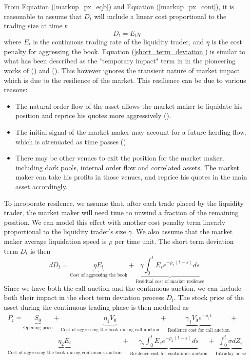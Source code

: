 \documentclass{article}
\begin{document}
From Equation (\ref{markup_px_eqb}) and Equation (\ref{markup_px_cont}), it is reasonable to assume that $D_t$ will include a linear cost proportional to the trading size at time $t$:
\begin{equation}\label{short_term_deviation}
  D_t = E_t \eta
\end{equation}
where $E_t$ is the continuous trading rate of the liquidity trader, and $\eta$ is the cost penalty for aggressing the book. Equation (\ref{short_term_deviation}) is similar to what has been described as the "temporary impact" term in in the pioneering works of (\cite{BertimasLo1999}) and (\cite{AlmgrenChriss2000}). This however ignores the transient nature of market impact which is due to the resilience of the market. This resilience can be due to various reasons:
\begin{itemize}
  \item The natural order flow of the asset allows the market maker to liquidate his position and reprice his quotes more aggressively (\cite{Avellaneda2008}).
  \item The initial signal of the market maker may account for a future herding flow, which is attenuated as time passes (\cite{Thibault2015})
  \item There may be other venues to exit the position for the market maker, including dark pools, internal order flow and correlated assets. The market maker can take his profits in those venues, and reprice his quotes in the main asset accordingly.
\end{itemize}
To incoporate resilence, we assume that, after each trade placed by the liquidity trader, the market maker will need time to unwind a fraction of the remaining position. We can model this effect with another cost penalty term linearly proportional to the liquidity trader's size $\gamma$. We also assume that the market maker average liquidation speed is $\rho$ per time unit. The short term deviation term $D_t$ is then
\[
  dD_t = \underbrace{\eta E_t}_\text{Cost of aggressing the book} + \underbrace{\gamma \int_0^t E_s e^{-\rho_2 (t-s)} ds}_\text{Residual cost of market resilence}
\]
Since we have both the call auction and the continuous auction, we can include both their impact in the short term deviation process $D_t$. The stock price of the asset during the continuous trading phase is then modelled as
\begin{equation}\label{resilence_eqn}
  \begin{split}
    P_t = \underbrace{S_0}_{\text{Opening price}} + \underbrace{\eta_1 V_0}_\text{Cost of aggressing the book during call auction}
    + \underbrace{\gamma_1 V_0 e^{-\rho_1 t}}_{\text{Resilence cost for call auction}}+ \\
    \underbrace{\eta_2 E_t}_\text{Cost of aggressing the book during continuous auction} + \underbrace{\gamma_2 \int_0^t E_s e^{-\rho_2 (t-s)} ds}_{\text{Resilence cost for continuous auction}} +  \underbrace{\int_0^t \sigma dZ_s}_{\text{Intraday noise}}
  \end{split}
\end{equation}
\end{document}
